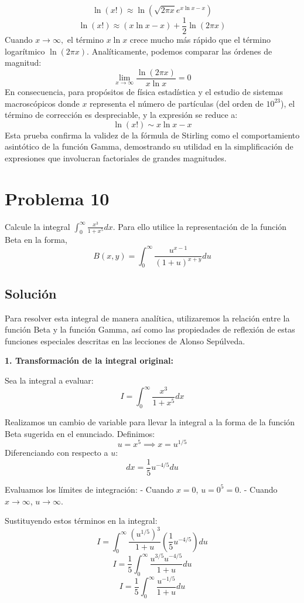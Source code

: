 \documentclass[a4paper]{article}
\begin{document}
$$ \ln(x!) \approx \ln \left( \sqrt{2\pi x} e^{x \ln x - x} \right) $$
$$ \ln(x!) \approx (x \ln x - x) + \frac{1}{2} \ln(2\pi x) $$
Cuando $x \to \infty,$ el término $x \ln x$ crece mucho más rápido que el término logarítmico $\ln(2\pi x).$ Analíticamente, podemos comparar las órdenes de magnitud:
$$ \lim_{x \to \infty} \frac{\ln(2\pi x)}{x \ln x} = 0 $$
En consecuencia, para propósitos de física estadística y el estudio de sistemas macroscópicos donde $x$ representa el número de partículas (del orden de $10^{23}$), el término de corrección es despreciable, y la expresión se reduce a:
$$ \ln(x!) \sim x \ln x - x $$
Esta prueba confirma la validez de la fórmula de Stirling como el comportamiento asintótico de la función Gamma, demostrando su utilidad en la simplificación de expresiones que involucran factoriales de grandes magnitudes.


\section{Problema 10}
Calcule la integral $\int_{0}^{\infty} \frac{x^3}{1+x^5} dx$. Para ello utilice la representación de la función Beta en la forma,
$$B(x, y) = \int_{0}^{\infty} \frac{u^{x-1}}{(1+u)^{x+y}} du$$

\subsection{Solución}

Para resolver esta integral de manera analítica, utilizaremos la relación entre la función Beta y la función Gamma, así como las propiedades de reflexión de estas funciones especiales descritas en las lecciones de Alonso Sepúlveda.

\textbf{1. Transformación de la integral original:}

Sea la integral a evaluar:
$$ I = \int_{0}^{\infty} \frac{x^3}{1+x^5} dx $$

Realizamos un cambio de variable para llevar la integral a la forma de la función Beta sugerida en el enunciado. Definimos:
$$ u = x^5 \implies x = u^{1/5} $$
Diferenciando con respecto a $u$:
$$ dx = \frac{1}{5} u^{-4/5} du $$

Evaluamos los límites de integración:
- Cuando $x = 0$, $u = 0^5 = 0$.
- Cuando $x \to \infty$, $u \to \infty$.

Sustituyendo estos términos en la integral:
$$ I = \int_{0}^{\infty} \frac{(u^{1/5})^3}{1+u} \left( \frac{1}{5} u^{-4/5} \right) du $$
$$ I = \frac{1}{5} \int_{0}^{\infty} \frac{u^{3/5} u^{-4/5}}{1+u} du $$
$$ I = \frac{1}{5} \int_{0}^{\infty} \frac{u^{-1/5}}{1+u} du $$
\end{document}
